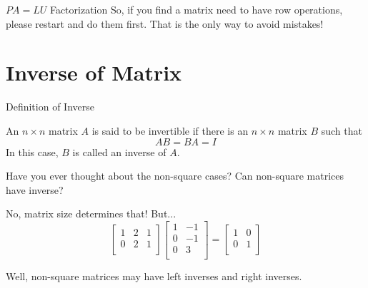 \documentclass{beamer}
\begin{document}
\begin{frame}{$PA=LU$ Factorization}
So, if you find a matrix need to have row operations, please restart and do them first. That is the only way to avoid mistakes!
\end{frame}

\section{Inverse of Matrix}
\begin{frame}{Definition of Inverse}
\begin{theorem}
An $n \times n$ matrix $A$ is said to be invertible if there is an $n \times n$ matrix $B$ such that
\begin{equation*}
    AB=BA=I
\end{equation*}
In this case, $B$ is called an \alert{inverse} of $A$.
\end{theorem}

Have you ever thought about the non-square cases? Can non-square matrices have inverse?

No, matrix size determines that! But...
\begin{equation*}
    \left[ \begin{matrix}
        1&		2&		1\\
        0&		2&		1\\
    \end{matrix} \right] \left[ \begin{matrix}
        1&		-1\\
        0&		-1\\
        0&		3\\
    \end{matrix} \right] =\left[ \begin{matrix}
        1&		0\\
        0&		1\\
    \end{matrix} \right]
\end{equation*}

Well, non-square matrices may have left inverses and right inverses.
\end{frame}
\end{document}
